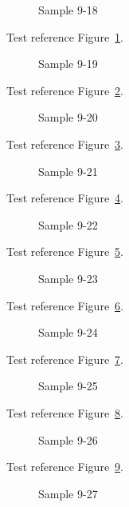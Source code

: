\begin{figure}[tbhp]
\caption{Sample 9-18}
\label{fig:sample-9-18}
\end{figure}

Test reference Figure~\ref{fig:sample-9-18}.

\begin{figure}[tbhp]
\caption{Sample 9-19}
\label{fig:sample-9-19}
\end{figure}

Test reference Figure~\ref{fig:sample-9-19}.

\begin{figure}[tbhp]
\caption{Sample 9-20}
\label{fig:sample-9-20}
\end{figure}

Test reference Figure~\ref{fig:sample-9-20}.

\begin{figure}[tbhp]
\caption{Sample 9-21}
\label{fig:sample-9-21}
\end{figure}

Test reference Figure~\ref{fig:sample-9-21}.

\begin{figure}[tbhp]
\caption{Sample 9-22}
\label{fig:sample-9-22}
\end{figure}

Test reference Figure~\ref{fig:sample-9-22}.

\begin{figure}[tbhp]
\caption{Sample 9-23}
\label{fig:sample-9-23}
\end{figure}

Test reference Figure~\ref{fig:sample-9-23}.

\begin{figure}[tbhp]
\caption{Sample 9-24}
\label{fig:sample-9-24}
\end{figure}

Test reference Figure~\ref{fig:sample-9-24}.

\begin{figure}[tbhp]
\caption{Sample 9-25}
\label{fig:sample-9-25}
\end{figure}

Test reference Figure~\ref{fig:sample-9-25}.

\begin{figure}[tbhp]
\caption{Sample 9-26}
\label{fig:sample-9-26}
\end{figure}

Test reference Figure~\ref{fig:sample-9-26}.

\begin{figure}[tbhp]
\caption{Sample 9-27}
\label{fig:sample-9-27}
\end{figure}

